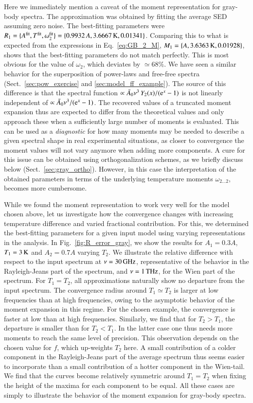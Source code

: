 \documentclass[usenatbib]{mn2e}
\begin{document}
Here we immediately mention a caveat of the moment representation for gray-body spectra. The approximation was obtained by fitting the average SED assuming zero noise. The best-fitting parameters were $R_1=\{A^{\rm fit}, T^{\rm fit}, \omega^{\rm fit}_2\}=\{0.9932\,A, 3.6667\,{\rm K}, 0.01341\}$. Comparing this to what is expected from the expressions in Eq.~\eqref{eq:GB_2_M}, $M_1=\{A, 3.6363\,{\rm K}, 0.01928\}$, shows that the best-fitting parameters do not match perfectly. This is most obvious for the value of $\omega_2$, which deviates by $\simeq 68\%$. We have seen a similar behavior for the superposition of power-laws and free-free spectra (Sect.~\ref{sec:pow_exercise} and \ref{sec:model_ff_example}).
%
The source of this difference is that the spectral function $\propto\bar{A}_0 \nu^3\,Y_2(x)/({{\rm e}^{x}}-1)$ is not linearly independent of $\propto\bar{A}_0 \nu^3/({{\rm e}^{x}}-1)$. The recovered values of a truncated moment expansion thus are expected to differ from the theoretical values and only approach these when a sufficiently large number of moments is evaluated. This can be used as a {\it diagnostic} for how many moments may be needed to describe a given spectral shape in real experimental situations, as closer to convergence the moment values will not vary anymore when adding more components. A cure for this issue can be obtained using orthogonalization schemes, as we briefly discuss below (Sect.~\ref{sec:gray_ortho}). However, in this case the interpretation of the obtained parameters in terms of the underlying temperature moments $\omega_{2\ldots2}$, becomes more cumbersome.  

While we found the moment representation to work very well for the model chosen above, let us investigate how the convergence changes with increasing temperature difference and varied fractional contribution. For this, we determined the best-fitting parameters for a given input model using varying representations in the analysis. In Fig.~\ref{fig:R_error_gray}, we show the results for $A_1=0.3 A$, $T_1=3\,{\rm K}$ and $A_2=0.7 A$ varying $T_2$. We illustrate the relative difference with respect to the input spectrum at $\nu=30\,{\rm GHz}$, representative of the behavior in the Rayleigh-Jeans part of the spectrum, and $\nu=1\,{\rm THz}$, for the Wien part of the spectrum. For $T_1=T_2$, all approximations naturally show no departure from the input spectrum. The convergence radius around $T_1\simeq T_2$ is larger at low frequencies than at high frequencies, owing to the asymptotic behavior of the moment expansion in this regime. 
%
For the chosen example, the convergence is faster at low than at high frequencies. Similarly, we find that for $T_2>T_1$, the departure is smaller than for $T_2<T_1$. In the latter case one thus needs more moments to reach the same level of precision. This observation depends on the chosen value for $f$, which up-weights $T_2$ here. A small contribution of a colder component in the Rayleigh-Jeans part of the average spectrum thus seems easier to incorporate than a small contribution of a hotter component in the Wien-tail. We find that the curves become relatively symmetric around $T_1= T_2$ when fixing the height of the maxima for each component to be equal. All these cases are simply to illustrate the  behavior of the moment expansion for gray-body spectra.
\end{document}
